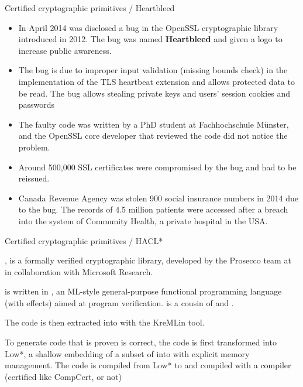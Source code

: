 \documentclass[compress,dvipdfmx]{beamer}
\begin{document}
\begin{frame}{Certified cryptographic primitives / Heartbleed}

  \begin{itemize}

    \item In April 2014 was disclosed a bug in the OpenSSL
      cryptographic library introduced in 2012. The bug was named
      \textbf{Heartbleed} and given a logo to increase public
      awareness.

    \item The bug is due to improper input validation (missing bounds
      check) in the implementation of the TLS heartbeat extension and
      allows protected data to be read.  The bug allows stealing
      private keys and users' session cookies and passwords

    \item The faulty code was written by a PhD student at
      Fachhochschule Münster, and the OpenSSL core developer that
      reviewed the code did not notice the problem.

    \item Around 500,000 SSL certificates were compromised by the bug
      and had to be reissued.

    \item Canada Revenue Agency was stolen 900 social insurance
      numbers in 2014 due to the bug. The records of 4.5 million
      patients were accessed after a breach into the system of
      Community Health, a private hospital in the USA.

  \end{itemize}

\end{frame}


\begin{frame}{Certified cryptographic primitives / HACL*}

  \HACLstar, is a formally verified cryptographic library, developed
  by the Prosecco team at \Inria in collaboration with Microsoft
  Research.

  \bigskip

  \HACLstar is written in \Fstar, an \textsf{ML}-style general-purpose
  functional programming language (with effects) aimed at program
  verification. \Fstar is a cousin of \OCaml and \Coq.

  \bigskip

  The \Fstar code is then extracted into \Clang with the
  \textsf{KreMLin} tool.

  \bigskip

  To generate \Clang code that is proven is correct, the \Fstar code
  is first transformed into \textsf{Low*}, a shallow embedding of a
  subset of \Clang into \Fstar with explicit memory management. The
  code is compiled from \textsf{Low*} to \Clang and compiled with a
  \Clang compiler (certified like CompCert, or not)

\end{frame}
\end{document}
